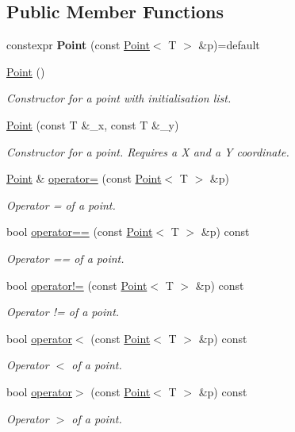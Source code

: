 \subsection*{Public Member Functions}
\begin{DoxyCompactItemize}
\item 
\mbox{\label{classPoint_a46b19075d2bb9592f4a8ac310b1fe29d}} 
constexpr {\bfseries Point} (const \hyperlink{classPoint}{Point}$<$ T $>$ \&p)=default
\item 
\mbox{\label{classPoint_aea76b1130f1a203722d8f2254ced8e66}} 
\hyperlink{classPoint_aea76b1130f1a203722d8f2254ced8e66}{Point} ()
\begin{DoxyCompactList}\small\item\em Constructor for a point with initialisation list. \end{DoxyCompactList}\item 
\hyperlink{classPoint_a0a84c3f55d42ec6e142de0251ea255ad}{Point} (const T \&\+\_\+x, const T \&\+\_\+y)
\begin{DoxyCompactList}\small\item\em Constructor for a point. Requires a X and a Y coordinate. \end{DoxyCompactList}\item 
\hyperlink{classPoint}{Point} \& \hyperlink{classPoint_a2e9aa15e5410f48937c9d474262dab3e}{operator=} (const \hyperlink{classPoint}{Point}$<$ T $>$ \&p)
\begin{DoxyCompactList}\small\item\em Operator = of a point. \end{DoxyCompactList}\item 
bool \hyperlink{classPoint_aaaaac8f25a60bca6ae5ddbb34fd3e9d8}{operator==} (const \hyperlink{classPoint}{Point}$<$ T $>$ \&p) const
\begin{DoxyCompactList}\small\item\em Operator == of a point. \end{DoxyCompactList}\item 
bool \hyperlink{classPoint_ac0b85ea22cdadeed30c4a8db0cfc76f9}{operator!=} (const \hyperlink{classPoint}{Point}$<$ T $>$ \&p) const
\begin{DoxyCompactList}\small\item\em Operator != of a point. \end{DoxyCompactList}\item 
bool \hyperlink{classPoint_a4871508a56f646b8e95cd11257ea093e}{operator$<$} (const \hyperlink{classPoint}{Point}$<$ T $>$ \&p) const
\begin{DoxyCompactList}\small\item\em Operator $<$ of a point. \end{DoxyCompactList}\item 
bool \hyperlink{classPoint_acc5ef36d8fd82f6034ec4764f7c7cbf8}{operator$>$} (const \hyperlink{classPoint}{Point}$<$ T $>$ \&p) const
\begin{DoxyCompactList}\small\item\em Operator $>$ of a point. \end{DoxyCompactList}\end{DoxyCompactItemize}
